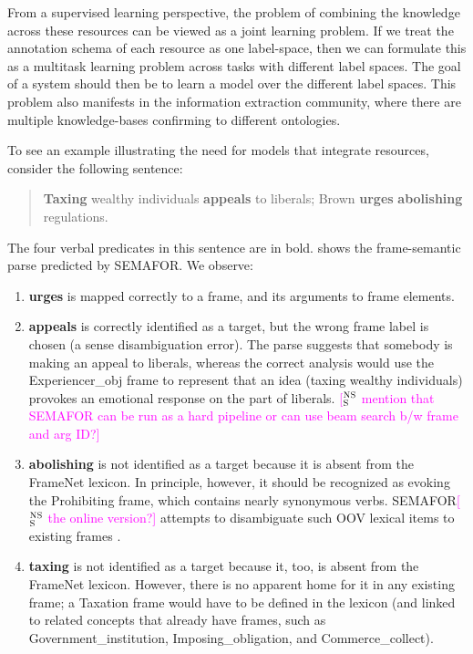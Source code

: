 \documentclass[11pt]{article}
\newcommand{\ensuretext}[1]{#1}
\newcommand{\nssmarker}{\ensuretext{\textcolor{magenta}{\ensuremath{^{\textsc{NS}}_{\textsc{S}}}}}}
\newcommand{\arkcomment}[3]{\ensuretext{\textcolor{#3}{[#1 #2]}}}
\newcommand{\nss}[1]{\arkcomment{\nssmarker}{#1}{magenta}}
\newcommand{\vpred}[1]{\textbf{#1}}
\begin{document}
From a supervised learning perspective, the problem of combining the knowledge across these resources can be viewed as a joint learning problem. If we treat the annotation schema of each resource as one label-space, then we can formulate this as a multitask learning problem across tasks with different label spaces. The goal of a system should then be to learn a model over the different label spaces. This problem also manifests in the information extraction community, where there are multiple knowledge-bases confirming to different ontologies.  

To see an example illustrating the need for models that integrate resources, consider the following sentence:
\begin{quote}
\vpred{Taxing} wealthy individuals \vpred{appeals} to liberals; Brown \vpred{urges} \vpred{abolishing} regulations.
\end{quote}
The four verbal predicates in this sentence are in bold. 
 shows the frame-semantic parse predicted by SEMAFOR. 
We observe:
\begin{enumerate}
  \item \vpred{urges} is mapped correctly to a frame, and its arguments to frame elements. 
  \item \vpred{appeals} is correctly identified as a target, but the wrong frame label is chosen 
  (a sense disambiguation error). The parse suggests that somebody is making an appeal to liberals, 
  whereas the correct analysis would use the Experiencer\_obj frame to represent that an idea
  (taxing wealthy individuals) provokes an emotional response on the part of liberals. 
  \nss{mention that SEMAFOR can be run as a hard pipeline or can use beam search b/w frame and arg ID?}
  \item \vpred{abolishing} is not identified as a target because it is absent from the FrameNet lexicon. 
  In principle, however, it should be recognized as evoking the Prohibiting frame, which contains 
  nearly synonymous verbs. SEMAFOR\nss{the online version?} attempts to disambiguate such OOV lexical items 
  to existing frames \cite{das-acl2011}.
  \item \vpred{taxing} is not identified as a target because it, too, is absent from the FrameNet lexicon. 
  However, there is no apparent home for it in any existing frame; a Taxation frame would have to be defined 
  in the lexicon (and linked to related concepts that already have frames, such as Government\_institution, 
  Imposing\_obligation, and Commerce\_collect).
\end{enumerate}
\end{document}
